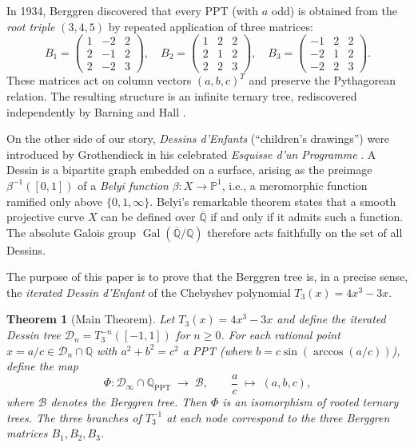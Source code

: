 \documentclass[12pt]{amsart}
\newtheorem{theorem}{Theorem}[section]
\theoremstyle{definition}
\theoremstyle{remark}
\newcommand{\QQ}{\mathbb{Q}}
\newcommand{\PP}{\mathbb{P}}
\newcommand{\Gal}{\operatorname{Gal}}
\newcommand{\PPT}{\mathrm{PPT}}
\begin{document}
In 1934, Berggren \cite{berggren1934} discovered that every PPT (with $a$
odd) is obtained from the \emph{root triple} $(3,4,5)$ by repeated
application of three matrices:
\begin{equation}\label{eq:berggren-matrices}
  B_1 = \begin{pmatrix} 1 & -2 & 2 \\ 2 & -1 & 2 \\ 2 & -2 & 3 \end{pmatrix}, \quad
  B_2 = \begin{pmatrix} 1 & 2 & 2 \\ 2 & 1 & 2 \\ 2 & 2 & 3 \end{pmatrix}, \quad
  B_3 = \begin{pmatrix} -1 & 2 & 2 \\ -2 & 1 & 2 \\ -2 & 2 & 3 \end{pmatrix}.
\end{equation}
These matrices act on column vectors $(a,b,c)^T$ and preserve the
Pythagorean relation.  The resulting structure is an infinite ternary tree,
rediscovered independently by Barning \cite{barning1963} and
Hall \cite{hall1970}.

On the other side of our story, \emph{Dessins d'Enfants} (``children's
drawings'') were introduced by Grothendieck in his celebrated
\emph{Esquisse d'un Programme} \cite{grothendieck1984}.  A Dessin is a
bipartite graph embedded on a surface, arising as the preimage
$\beta^{-1}([0,1])$ of a \emph{Belyi function} $\beta:X\to\PP^1$,
i.e., a meromorphic function ramified only above $\{0,1,\infty\}$.
Belyi's remarkable theorem \cite{belyi1979} states that a smooth
projective curve $X$ can be defined over $\overline{\QQ}$ if and only
if it admits such a function.  The absolute Galois group
$\Gal(\overline{\QQ}/\QQ)$ therefore acts faithfully on the set of
all Dessins.

The purpose of this paper is to prove that the Berggren tree is,
in a precise sense, the \emph{iterated Dessin d'Enfant} of the
Chebyshev polynomial $T_3(x) = 4x^3-3x$.

\begin{theorem}[Main Theorem]\label{thm:main}
Let $T_3(x) = 4x^3-3x$ and define the \emph{iterated Dessin tree}
$\mathcal{D}_n = T_3^{-n}([-1,1])$ for $n\ge 0$.  For each rational
point $x = a/c \in \mathcal{D}_n \cap \QQ$ with $a^2+b^2=c^2$ a PPT
(where $b = c\sin(\arccos(a/c))$), define the map
\[
  \Phi\colon \mathcal{D}_\infty \cap \QQ_{\PPT} \;\longrightarrow\; \mathcal{B},
  \qquad \frac{a}{c} \;\longmapsto\; (a,b,c),
\]
where $\mathcal{B}$ denotes the Berggren tree.  Then $\Phi$ is an
isomorphism of rooted ternary trees.  The three branches of $T_3^{-1}$
at each node correspond to the three Berggren matrices $B_1, B_2, B_3$.
\end{theorem}
\end{document}
